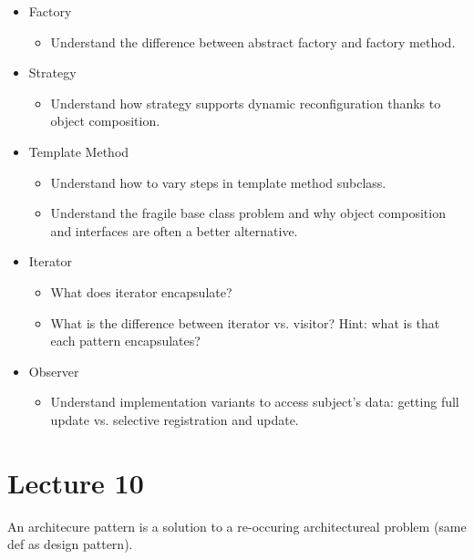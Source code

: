 \documentclass{article}
\begin{document}
\begin{itemize}
\begin{itemize}
    \end{itemize}
    \item Factory
    \begin{itemize}
        \item Understand the difference between abstract factory and factory method.
    \end{itemize}
    \item Strategy
    \begin{itemize}
        \item Understand how strategy supports dynamic reconfiguration thanks to
        object composition.
    \end{itemize}
    \item Template Method
    \begin{itemize}
        \item Understand how to vary steps in template method subclass.
        \item Understand the fragile base class problem and why object composition and interfaces are often a better alternative.
    \end{itemize}
    \item Iterator
    \begin{itemize}
        \item What does iterator encapsulate?
        \item What is the difference between iterator vs. visitor? Hint: what is that each pattern encapsulates?
    \end{itemize}
    \item Observer
    \begin{itemize}
        \item Understand implementation variants to access subject's data: getting full update vs. selective registration and update.
    \end{itemize}
\end{itemize}

\section*{Lecture 10} %
\label{sec:lecture_10}
An architecure pattern is a solution to a re-occuring architectureal problem (same def as design pattern).
\end{document}
